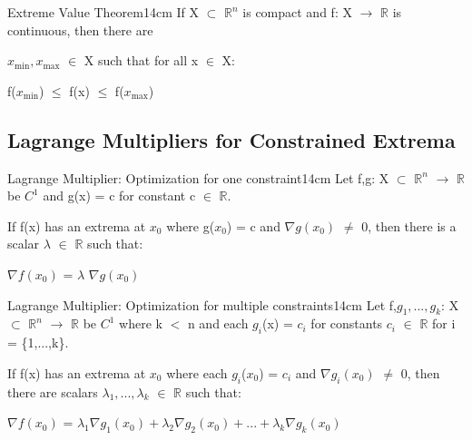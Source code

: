     \vspace{0.5cm}



    \begin{wtheorem}{Extreme Value Theorem}{14cm}
        If X $\subset$ $\mathbb{R}^n$ is compact and
        f: X $\rightarrow$ $\mathbb{R}$ is continuous, then there are

        $x_{\text{min}},x_{\text{max}}$ $\in$ X such that for all x $\in$ X:

        \hspace{0.5cm}
        f($x_{\text{min}}$) $\leq$ f(x) $\leq$ f($x_{\text{max}}$)
    \end{wtheorem}

    \newpage





\subsection[ Lagrange Multipliers ]{ Lagrange Multipliers for Constrained Extrema }

    \begin{wtheorem}{Lagrange Multiplier: Optimization for one constraint}{14cm}
        Let f,g: X $\subset$ $\mathbb{R}^n$ $\rightarrow$ $\mathbb{R}$
        be $C^1$ and g(x) = c for constant c $\in$ $\mathbb{R}$.
        
        If f(x) has an extrema at $x_0$ where g($x_0$) = c and
        $\nabla g(x_0)$ $\not =$ 0, then there is a scalar $\lambda$ $\in$
        $\mathbb{R}$ such that:

        \hspace{0.5cm}
        $\nabla f(x_0)$ = $\lambda$ $\nabla g(x_0)$
    \end{wtheorem}

    \vspace{0.5cm}



    \begin{wtheorem}{Lagrange Multiplier: Optimization for multiple constraints}{14cm}
        Let f,$g_1,...,g_k$: X $\subset$ $\mathbb{R}^n$ $\rightarrow$ $\mathbb{R}$
        be $C^1$ where k $<$ n and each $g_i$(x) = $c_i$ for constants
        $c_i$ $\in$ $\mathbb{R}$ for i = \{1,...,k\}.
        
        If f(x) has an extrema at $x_0$ where each $g_i$($x_0$) = $c_i$ and
        $\nabla g_i(x_0)$ $\not =$ 0, then there are scalars
        $\lambda_1,...,\lambda_k$ $\in$ $\mathbb{R}$ such that:

        \hspace{0.5cm}
        $\nabla f(x_0)$ = $\lambda_1 \nabla g_1(x_0)
                            + \lambda_2 \nabla g_2(x_0)
                            + ... + \lambda_k \nabla g_k(x_0)$
    \end{wtheorem}




